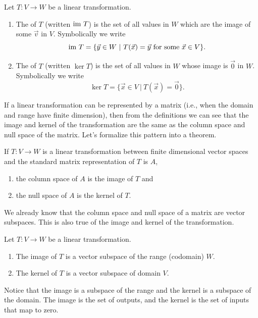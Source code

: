 \begin{definition}
Let $T\colon V\to W$ be a linear transformation.  
\begin{enumerate}
	\item The  of $T$ (written $\text{im } T$) is the set of all values in $W$ which are the image of some $\vec v$ in $V$. 
	Symbolically we write $$\text{im } T = \{\vec y\in W \ | \ T(\vec x)=\vec y \text{ for some $\vec x\in V$}\}.$$ 
	\item The  of $T$ (written $\ker T$) is the set of all values in $W$ whose image is $\vec 0$ in $W$. 
	Symbolically we write $$\ker T = \{\vec x\in V \ | \ T(\vec x)=\vec 0\}.$$
\end{enumerate}
\end{definition}



If a linear transformation can be represented by a matrix (i.e., when the domain and range have finite dimension), then from the definitions we can see that the image and kernel of the transformation are the same as the column space and null space of the matrix.  Let's formalize this pattern into a theorem.

\begin{theorem}
If $T\colon V\to W$ is a linear transformation between finite dimensional vector spaces and the standard matrix representation of $T$ is $A$, 
\begin{enumerate}
	\item the column space of $A$ is the image of $T$ and 
	\item the null space of $A$ is the kernel of $T$.
\end{enumerate}
\end{theorem}

We already know that the column space and null space of a matrix are vector subspaces.  This is also true of the image and kernel of the transformation.

\begin{theorem}
Let $T\colon V\to W$ be a linear transformation. 
\begin{enumerate}
	\item The image of $T$ is a vector subspace of the range (codomain) $W$. 
	\item The kernel of $T$ is a vector subspace of domain $V$.
\end{enumerate}
\end{theorem}
Notice that the image is a subspace of the range and the kernel is a subspace of the domain. The image is the set of outputs, and the kernel is the set of inputs that map to zero. 

